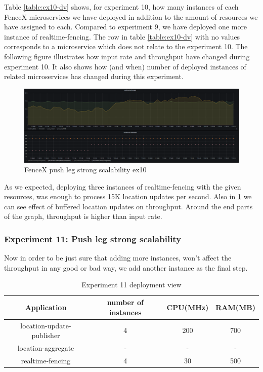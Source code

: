\documentclass[a4]{report}
\begin{document}
    Table \ref{table:ex10-dv} shows, for experiment 10, how many instances of each FenceX microservices we have
    deployed in addition to the amount of resources we have assigned to each.
    Compared to experiment 9, we have deployed one more instance of realtime-fencing.
    The row in table \ref{table:ex10-dv} with no values corresponds to a microservice which does not relate to the experiment 10.
    The following figure illustrates how input rate and throughput have changed during experiment 10.
    It also shows how (and when) number of deployed instances of related microservices has changed during this
    experiment.

    \begin{figure}
        \caption{FenceX push leg strong scalability ex10}
        \label{fig:ex10}
        \includegraphics[scale=0.5]{images/evaluation/ex10-benchmarking-ongoing-2per4sec.png}
    \end{figure}

    \clearpage

    As we expected, deploying three instances of realtime-fencing with the given resources, was enough to process 15K
    location updates per second.
    Also in \ref{fig:ex10} we can see effect of buffered location updates on throughput.
    Around the end parts of the graph, throughput is higher than input rate.

    \subsubsection{Experiment 11: Push leg strong scalability}
    Now in order to be just sure that adding more instances, won't affect the throughput in any good or bad way, we
    add another instance as the final step.

    \begin{table}[h!]
        \centering
        \begin{tabular}{|c|c|c|c|}
            \hline
            Application               & number of instances & CPU(MHz) & RAM(MB) \\
            \hline
            location-update-publisher & 4                   & 200      & 700     \\
            location-aggregate        & -                   & -        & -       \\
            realtime-fencing          & 4                   & 30       & 500     \\
            \hline
        \end{tabular}
        \caption{Experiment 11 deployment view}
        \label{table:ex11-dv}
    \end{table}
\end{document}
